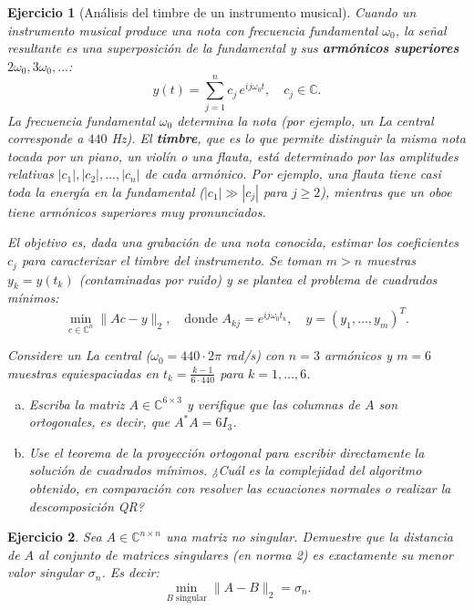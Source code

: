 \documentclass[12pt]{article}
\newtheorem{exercise}{Ejercicio}
\begin{document}
\begin{exercise}[Análisis del timbre de un instrumento musical]
Cuando un instrumento musical produce una nota con frecuencia fundamental $\omega_0$, la señal resultante es una superposición de la fundamental y sus \textbf{armónicos superiores} $2\omega_0, 3\omega_0, \ldots$:
\[
y(t) = \sum_{j=1}^n c_j \, e^{i j \omega_0 t}, \quad c_j \in \mathbb{C}.
\]
La frecuencia fundamental $\omega_0$ determina la \textit{nota} (por ejemplo, un La central corresponde a $440$ Hz). El \textbf{timbre}, que es lo que permite distinguir la misma nota tocada por un piano, un violín o una flauta, está determinado por las amplitudes relativas $|c_1|, |c_2|, \ldots, |c_n|$ de cada armónico. Por ejemplo, una flauta tiene casi toda la energía en la fundamental ($|c_1| \gg |c_j|$ para $j \geq 2$), mientras que un oboe tiene armónicos superiores muy pronunciados.

El objetivo es, dada una grabación de una nota conocida, estimar los coeficientes $c_j$ para caracterizar el timbre del instrumento. Se toman $m > n$ muestras $y_k = y(t_k)$ (contaminadas por ruido) y se plantea el problema de cuadrados mínimos:
\[
\min_{c \in \mathbb{C}^n} \|Ac - y\|_2, \quad \text{donde } A_{kj} = e^{i j \omega_0 t_k}, \quad y = (y_1, \ldots, y_m)^T.
\]

Considere un La central ($\omega_0 = 440 \cdot 2\pi$ rad/s) con $n = 3$ armónicos y $m = 6$ muestras equiespaciadas en $t_k = \frac{k-1}{6 \cdot 440}$ para $k = 1, \ldots, 6$.
\begin{enumerate}[(a)]
\item Escriba la matriz $A \in \mathbb{C}^{6 \times 3}$ y verifique que las columnas de $A$ son ortogonales, es decir, que $A^*A = 6 I_3$.
\item Use el teorema de la proyección ortogonal para escribir directamente la solución de cuadrados mínimos. ¿Cuál es la complejidad del algoritmo obtenido, en comparación con resolver las ecuaciones normales o realizar la descomposición QR?
\end{enumerate}
\end{exercise}



\begin{exercise}
Sea $A \in \mathbb{C}^{n \times n}$ una matriz no singular. Demuestre que la distancia de $A$ al conjunto de matrices singulares (en norma 2) es exactamente su menor valor singular $\sigma_n$. Es decir:
\[
\min_{B \text{ singular}} \|A - B\|_2 = \sigma_n.
\]
\end{exercise}
\end{document}
